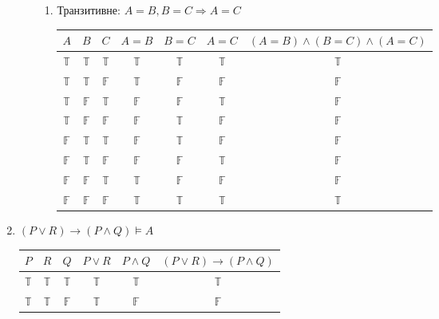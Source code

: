 \documentclass[a4paper,12pt]{article}
\begin{document}
\begin{enumerate}
\begin{enumerate}
\begin{enumerate}
\item Транзитивне: $A=B, B=C\Rightarrow A=C$
\begin{table}[htp]\centering
\begin{tabular}{|c|c|c|c|c|c|c|}\hline
$A$          & $B$          & $C$          & $A=B$        & $B=C$        & $A=C$        & $(A=B)\land(B=C)\land(A=C)$          \\\hline
$\mathbb{T}$ & $\mathbb{T}$ & $\mathbb{T}$ & $\mathbb{T}$ & $\mathbb{T}$ & $\mathbb{T}$ & \cellcolor[HTML]{9AFF99}$\mathbb{T}$ \\
$\mathbb{T}$ & $\mathbb{T}$ & $\mathbb{F}$ & $\mathbb{T}$ & $\mathbb{F}$ & $\mathbb{F}$ & $\mathbb{F}$                         \\
$\mathbb{T}$ & $\mathbb{F}$ & $\mathbb{T}$ & $\mathbb{F}$ & $\mathbb{F}$ & $\mathbb{T}$ & \cellcolor[HTML]{FFFFFF}$\mathbb{F}$ \\
$\mathbb{T}$ & $\mathbb{F}$ & $\mathbb{F}$ & $\mathbb{F}$ & $\mathbb{T}$ & $\mathbb{F}$ & $\mathbb{F}$                         \\
$\mathbb{F}$ & $\mathbb{T}$ & $\mathbb{T}$ & $\mathbb{F}$ & $\mathbb{T}$ & $\mathbb{F}$ & $\mathbb{F}$                         \\
$\mathbb{F}$ & $\mathbb{T}$ & $\mathbb{F}$ & $\mathbb{F}$ & $\mathbb{F}$ & $\mathbb{T}$ & $\mathbb{F}$                         \\
$\mathbb{F}$ & $\mathbb{F}$ & $\mathbb{T}$ & $\mathbb{T}$ & $\mathbb{F}$ & $\mathbb{F}$ & $\mathbb{F}$                         \\
$\mathbb{F}$ & $\mathbb{F}$ & $\mathbb{F}$ & $\mathbb{T}$ & $\mathbb{T}$ & $\mathbb{T}$ & \cellcolor[HTML]{9AFF99}$\mathbb{T}$ \\\hline 
\end{tabular}
\end{table}
 \end{enumerate} 
\end{enumerate}
\item $(P\lor R)\rightarrow (P\land Q)\models A$
\begin{table}[htp]\centering
\begin{tabular}{|c|c|c|c|c|c|}\hline
$P$          & $R$          & $Q$          & $P\lor R$    & $P\land Q$   & $(P\lor R)\rightarrow(P\land Q)$     \\\hline
$\mathbb{T}$ & $\mathbb{T}$ & $\mathbb{T}$ & $\mathbb{T}$ & $\mathbb{T}$ & \cellcolor[HTML]{9AFF99}$\mathbb{T}$ \\
$\mathbb{T}$ & $\mathbb{T}$ & $\mathbb{F}$ & $\mathbb{T}$ & $\mathbb{F}$ & $\mathbb{F}$                         \\

\end{tabular}
\end{table}
\end{enumerate}
\end{document}
